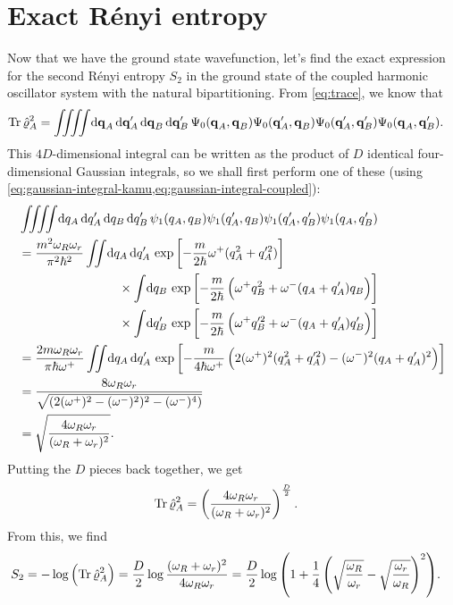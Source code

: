 \section{Exact Rényi entropy}

Now that we have the ground state wavefunction, let's find the exact expression for the second Rényi entropy $S_2$ in the ground state of the coupled harmonic oscillator system with the natural bipartitioning.
From \vref{eq:trace}, we know that
\begin{align}
	\Tr{\hat{\rho}_A^2}
	&= \iiiint\! \dif \vec{q}_A \dif \vec{q}_A' \dif \vec{q}_B \dif \vec{q}_B' \,
			\Psi_0(\vec{q}_A, \vec{q}_B) \Psi_0(\vec{q}_A', \vec{q}_B)
			\Psi_0(\vec{q}_A', \vec{q}_B') \Psi_0(\vec{q}_A, \vec{q}_B').
\end{align}
This $4 D$-dimensional integral can be written as the product of $D$ identical four-dimensional Gaussian integrals, so we shall first perform one of these (using \vref{eq:gaussian-integral-kamu,eq:gaussian-integral-coupled}):
\begin{subequations}
\begin{align}
	& \iiiint\! \dif q_A \dif q_A' \dif q_B \dif q_B' \,
			\psi_1(q_A, q_B) \psi_1(q_A', q_B) \psi_1(q_A', q_B') \psi_1(q_A, q_B') \\
	&= \frac{m^2 \omega_R \omega_r}{\pi^2 \hbar^2}
		\iint\! \dif q_A \dif q_A' \,
			\expb{-\frac{m}{2 \hbar} \omega^+ (q_A^2 + q_A'^2)} \notag \\
	&\qquad\qquad\qquad\qquad\times
			\int\! \dif q_B \,
				\expb{-\frac{m}{2 \hbar} \left(
					\omega^+ q_B^2 + \omega^- (q_A + q_A') q_B
				\right)} \notag \\
	&\qquad\qquad\qquad\qquad\times
			\int\! \dif q_B' \,
				\expb{-\frac{m}{2 \hbar} \left(
					\omega^+ q_B'^2 + \omega^- (q_A + q_A') q_B'
				\right)} \\
	&= \frac{2 m \omega_R \omega_r}{\pi \hbar \omega^+}
		\iint\! \dif q_A \dif q_A' \,
			\expb{-\frac{m}{4 \hbar \omega^+} \left( 2 (\omega^+)^2 (q_A^2 + q_A'^2) - (\omega^-)^2 (q_A + q_A')^2 \right)} \\
	&= \frac{8 \omega_R \omega_r}{\sqrt{(2 (\omega^+)^2 - (\omega^-)^2)^2 - (\omega^-)^4)}} \\
	&= \sqrt{\frac{4 \omega_R \omega_r}{(\omega_R + \omega_r)^2}}.
\end{align}
\end{subequations}
Putting the $D$ pieces back together, we get
\begin{align}
	\operatorname{Tr}{\hat{\varrho}_A^2}
	&= \left( \frac{4 \omega_R \omega_r}{(\omega_R + \omega_r)^2} \right)^\frac{D}{2}.
\end{align}
From this, we find
\begin{align}
	S_2
	&= -\log{\left( \operatorname{Tr}{\hat{\varrho}_A^2} \right)}
	= \frac{D}{2} \log{\frac{(\omega_R + \omega_r)^2}{4 \omega_R \omega_r}}
	= \frac{D}{2} \log{\left( 1 + \frac{1}{4} \left( \sqrt{\frac{\omega_R}{\omega_r}} - \sqrt{\frac{\omega_r}{\omega_R}} \right)^2 \right)}.
\end{align}


